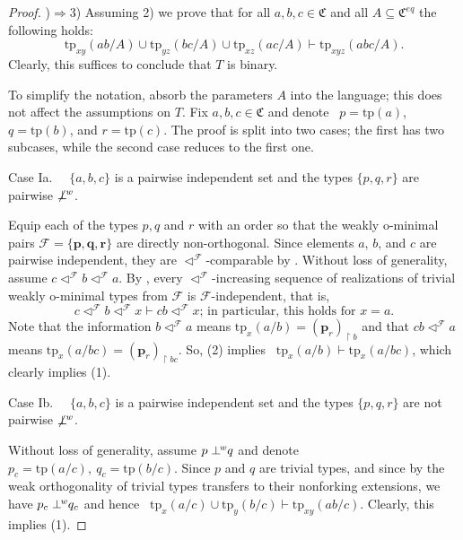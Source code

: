 \documentclass{amsart}
\theoremstyle{definition}
\theoremstyle{definition}
\def\strok{\restriction}
\newcommand{\wor}{\perp\hspace*{-0.4em}^{\mathit w}}
\newcommand{\nwor}{\not\perp\hspace*{-0.4em}^{\mathit w}}
\newcommand{\Mon}{\mathfrak C}
\newcommand{\Moneq}{\mathfrak C^{eq}}
\newcommand{\tp}{\mathrm{tp}}
\begin{document}
\begin{proof}
)$\Rightarrow$3) Assuming 2) we prove that for all $a,b,c\in\Mon$ and all $A\subseteq \Moneq$ the following holds: 
 \setcounter{equation}{0}
 \begin{equation}\tp_{xy}(ab/A)\cup \tp_{yz}(bc/A)\cup \tp_{xz}(ac/A)\vdash \tp_{xyz}(abc/A).
 \end{equation}
Clearly, this suffices to conclude that $T$ is binary. 

To simplify the notation, absorb the parameters $A$ into the language; this does not affect the  assumptions on $T$. 
Fix $a,b,c\in \Mon$ and denote \  $p=\tp(a)$, $q=\tp(b)$, and $r=\tp(c)$. The proof is split into two cases;  the first has  two subcases, while  the second case reduces to the first one. 

\smallskip 
 Case Ia.  \ \ $\{a,b,c\}$ is a pairwise independent set  and the types $\{p,q,r\}$ are pairwise $\nwor$.  

\smallskip
 Equip each of the types $p,q$ and $r$ with an order  so that the weakly o-minimal pairs $\mathcal F=\{\mathbf p, \mathbf q,\mathbf r\}$ are directly non-orthogonal. Since elements $a$, $b$, and $c$  are pairwise independent, they are $\triangleleft^{\mathcal F}$-comparable by \cite[Theorem 2.12]{MTwqom1}. Without loss of generality, assume $c\triangleleft^{\mathcal F} b\triangleleft^{\mathcal F} a$. 
By \cite[Proposition 5.13]{MTwqom1}, every $\triangleleft^{\mathcal F}$-increasing sequence  of realizations of trivial weakly o-minimal types from $\mathcal F$ is $\mathcal F$-independent, that is, \ \begin{equation}\mbox{$c\triangleleft^{\mathcal F} b\triangleleft^{\mathcal F} x\vdash cb\triangleleft^{\mathcal F}  x$; in particular, this holds for $x=a$.}
\end{equation}
Note that the information $b\triangleleft^{\mathcal F} a$ means $\tp_x(a/b)=(\mathbf p_r)_{\strok b}$ and that $cb\triangleleft^{\mathcal F}  a$ means 
$\tp_x(a/bc)=(\mathbf p_r)_{\strok bc}$. So, (2) implies \ $\tp_x(a/b)\vdash \tp_x(a/bc)$, which clearly implies (1).  

 \smallskip 
Case Ib.  \ \ $\{a,b,c\}$ is a pairwise independent set and the types $\{p,q,r\}$ are not pairwise $\nwor$.  

\smallskip
Without loss of generality, assume $p\wor q$ and denote $p_c=\tp(a/c),\ q_c=\tp(b/c)$. Since $p$ and $q$ are trivial types, and since by \cite[Theorem 5.10(c)]{MTwqom1} the weak orthogonality of trivial types transfers to their nonforking extensions, we have $p_c\wor q_c$ and hence \ $\tp_x(a/c)\cup \tp_y(b/c)\vdash \tp_{xy}(ab/c)$. Clearly, this implies (1). 
 

\end{proof}
\end{document}
